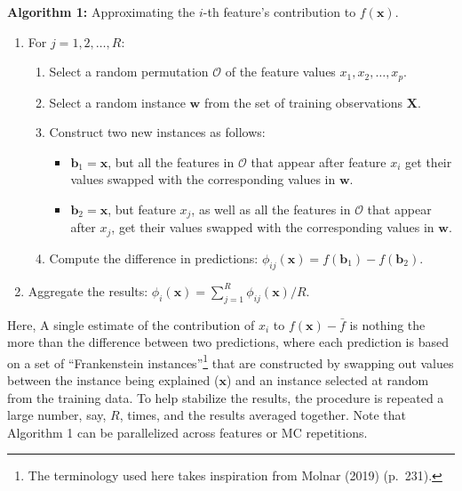 \noindent 
\textbf{Algorithm 1:} Approximating the \(i\)-th feature's contribution to \(f\left(\boldsymbol{x}\right)\).

\begin{enumerate}
\def\labelenumi{\arabic{enumi}.}
\tightlist
\item
  For \(j = 1, 2, \dots, R\):

  \begin{enumerate}
  \def\labelenumii{\alph{enumii}.}
  \tightlist
  \item
    Select a random permutation \(\mathcal{O}\) of the feature values \(x_1, x_2, \dots, x_p\).
  \item
    Select a random instance \(\boldsymbol{w}\) from the set of training observations \(\boldsymbol{X}\).
  \item
    Construct two new instances as follows:

    \begin{itemize}
    \tightlist
    \item
      \(\boldsymbol{b}_1 = \boldsymbol{x}\), but all the features in \(\mathcal{O}\) that appear after feature \(x_i\) get their values swapped with the corresponding values in \(\boldsymbol{w}\).
    \item
      \(\boldsymbol{b}_2 = \boldsymbol{x}\), but feature \(x_j\), as well as all the features in \(\mathcal{O}\) that appear after \(x_j\), get their values swapped with the corresponding values in \(\boldsymbol{w}\).
    \end{itemize}
  \item
    Compute the difference in predictions: \(\phi_{ij}\left(\boldsymbol{x}\right) = f\left(\boldsymbol{b}_1\right) - f\left(\boldsymbol{b}_2\right)\).
  \end{enumerate}
\item
  Aggregate the results: \(\phi_i\left(\boldsymbol{x}\right) = \sum_{j = 1} ^ R \phi_{ij}\left(\boldsymbol{x}\right) / R\).
\end{enumerate}

Here, A single estimate of the contribution of \(x_i\) to \(f\left(\boldsymbol{x}\right) - \bar{f}\) is nothing the more than the difference between two predictions, where each prediction is based on a set of ``Frankenstein instances''\footnote{The terminology used here takes inspiration from Molnar (2019) (p.~231).} that are constructed by swapping out values between the instance being explained (\(\boldsymbol{x}\)) and an instance selected at random from the training data. To help stabilize the results, the procedure is repeated a large number, say, \(R\), times, and the results averaged together. Note that Algorithm 1 can be parallelized across features or MC repetitions.

